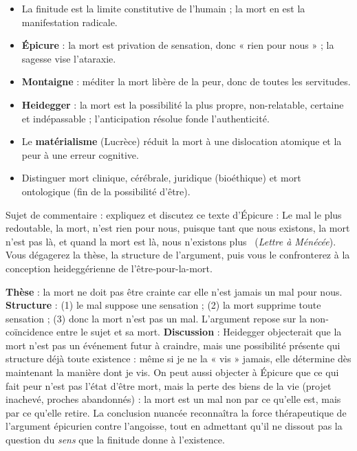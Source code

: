 \documentclass[11pt]{article}
\newcommand{\cle}[1]{{\popxbold\color{popdark}#1}}
\begin{document}
\begin{aretenir}
\begin{itemize}
\item La \cle{finitude} est la limite constitutive de l'humain ; la mort en est la manifestation radicale.
\item \textbf{Épicure} : la mort est privation de sensation, donc « rien pour nous » ; la sagesse vise l'ataraxie.
\item \textbf{Montaigne} : méditer la mort libère de la peur, donc de toutes les servitudes.
\item \textbf{Heidegger} : la mort est la possibilité la plus propre, non-relatable, certaine et indépassable ; l'anticipation résolue fonde l'authenticité.
\item Le \textbf{matérialisme} (Lucrèce) réduit la mort à une dislocation atomique et la peur à une erreur cognitive.
\item Distinguer mort clinique, cérébrale, juridique (bioéthique) et mort ontologique (fin de la possibilité d'être).
\end{itemize}
\end{aretenir}

\begin{exercice}
Sujet de commentaire : expliquez et discutez ce texte d'Épicure : \guillemotleft Le mal le plus redoutable, la mort, n'est rien pour nous, puisque tant que nous existons, la mort n'est pas là, et quand la mort est là, nous n'existons plus \guillemotright\ (\emph{Lettre à Ménécée}). Vous dégagerez la thèse, la structure de l'argument, puis vous le confronterez à la conception heideggérienne de l'être-pour-la-mort.
\end{exercice}

\begin{corrige}[Exercice]
\textbf{Thèse} : la mort ne doit pas être crainte car elle n'est jamais un mal pour nous. \textbf{Structure} : (1) le mal suppose une sensation ; (2) la mort supprime toute sensation ; (3) donc la mort n'est pas un mal. L'argument repose sur la non-coïncidence entre le sujet et sa mort. \textbf{Discussion} : Heidegger objecterait que la mort n'est pas un événement futur à craindre, mais une possibilité présente qui structure déjà toute existence : même si je ne la « vis » jamais, elle détermine dès maintenant la manière dont je vis. On peut aussi objecter à Épicure que ce qui fait peur n'est pas l'état d'être mort, mais la perte des biens de la vie (projet inachevé, proches abandonnés) : la mort est un mal non par ce qu'elle est, mais par ce qu'elle retire. La conclusion nuancée reconnaîtra la force thérapeutique de l'argument épicurien contre l'angoisse, tout en admettant qu'il ne dissout pas la question du \emph{sens} que la finitude donne à l'existence.
\end{corrige}
\end{document}
